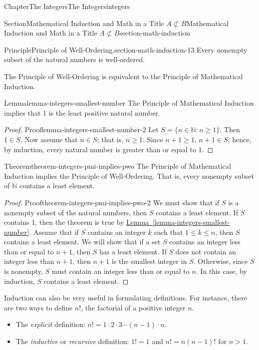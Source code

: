 \documentclass[oneside,10pt,]{book}
\newcommand{\xreffont}{\relax}
\numberwithin{equation}{section}
\newcommand{\notsubset}{\not\subset}
\newcommand{\gt}{>}
\begin{document}
\begin{chapterptx}{Chapter}{The Integers}{}{The Integers}{}{}{integers}
\begin{sectionptx}{Section}{Mathematical Induction and Math in a Title \(A\notsubset B\)}{}{Mathematical Induction and Math in a Title \(A\notsubset B\)}{}{}{section-math-induction}
\begin{principle}{Principle}{Principle of Well-Ordering.}{}{section-math-induction-13}%
Every nonempty subset of the natural numbers is well-ordered.%
\end{principle}
The Principle of Well-Ordering is equivalent to the Principle of Mathematical Induction.%
\begin{lemma}{Lemma}{}{}{lemma-integers-smallest-number}%
The Principle of Mathematical Induction implies that \(1\) is the least positive natural number.%
\end{lemma}
\begin{proof}{Proof}{}{lemma-integers-smallest-number-2}
Let \(S = \{ n \in {\mathbb N} : n \geq 1 \}\). Then \(1 \in S\).  Now assume that \(n \in S\); that is, \(n \geq 1\).  Since \(n+1 \geq 1\), \(n+ 1 \in S\); hence, by induction, every natural number is greater than or equal to 1.%
\end{proof}
\begin{theorem}{Theorem}{}{}{theorem-integers-pmi-implies-pwo}%
The Principle of Mathematical Induction implies the Principle of Well-Ordering.  That is, every nonempty subset of \(\mathbb N\) contains a least element.%
\end{theorem}
\begin{proof}{Proof}{}{theorem-integers-pmi-implies-pwo-2}
We must show that if \(S\) is a nonempty subset of the natural numbers, then \(S\) contains a least element.  If \(S\) contains 1, then the theorem is true by \hyperref[lemma-integers-smallest-number]{Lemma~{\xreffont\ref{lemma-integers-smallest-number}}}.  Assume that if \(S\) contains an integer \(k\) such that \(1 \leq k \leq n\), then \(S\) contains a least element.  We will show that if a set \(S\) contains an integer less than or equal to \(n + 1\), then \(S\) has a least element.  If \(S\) does not contain an integer less than \(n+1\), then \(n+1\) is the smallest integer in \(S\).  Otherwise, since \(S\) is nonempty, \(S\) must contain an integer less than or equal to \(n\). In this case, by induction, \(S\) contains a least element.%
\end{proof}
Induction can also be very useful in formulating definitions. For instance, there are two ways to define \(n!\), the factorial of a positive integer \(n\).%
\begin{itemize}[label=\textbullet]
\item{}The \emph{explicit} definition: \(n! = 1 \cdot 2 \cdot 3 \cdots (n - 1) \cdot n\).%
\item{}The \emph{inductive} or \emph{recursive} definition: \(1! = 1\) and \(n! = n(n - 1)!\) for \(n \gt 1\).%

\end{itemize}
\end{sectionptx}
\end{chapterptx}
\end{document}
